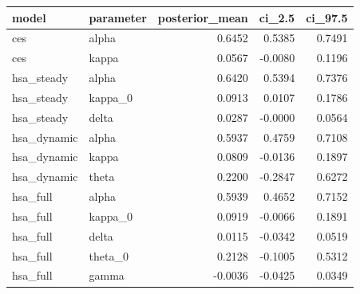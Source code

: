 \begin{tabular}{llrrr}
\toprule
model & parameter & posterior\_mean & ci\_2.5 & ci\_97.5 \\
\midrule
ces & alpha & 0.6452 & 0.5385 & 0.7491 \\
ces & kappa & 0.0567 & -0.0080 & 0.1196 \\
hsa\_steady & alpha & 0.6420 & 0.5394 & 0.7376 \\
hsa\_steady & kappa\_0 & 0.0913 & 0.0107 & 0.1786 \\
hsa\_steady & delta & 0.0287 & -0.0000 & 0.0564 \\
hsa\_dynamic & alpha & 0.5937 & 0.4759 & 0.7108 \\
hsa\_dynamic & kappa & 0.0809 & -0.0136 & 0.1897 \\
hsa\_dynamic & theta & 0.2200 & -0.2847 & 0.6272 \\
hsa\_full & alpha & 0.5939 & 0.4652 & 0.7152 \\
hsa\_full & kappa\_0 & 0.0919 & -0.0066 & 0.1891 \\
hsa\_full & delta & 0.0115 & -0.0342 & 0.0519 \\
hsa\_full & theta\_0 & 0.2128 & -0.1005 & 0.5312 \\
hsa\_full & gamma & -0.0036 & -0.0425 & 0.0349 \\
\bottomrule
\end{tabular}
